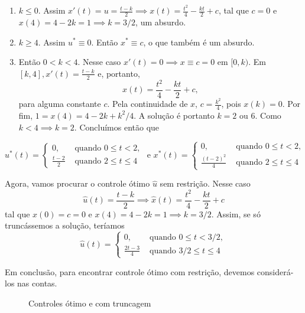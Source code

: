 \begin{enumerate}[label=\textbf{Caso \arabic*:}]
    \item $k \le 0$. Assim $x'(t) = u = \frac{t - k}{2} \implies x(t) = \frac{t^2}{4} - \frac{kt}{2} + c$, tal que $c=0$ e $x(4) = 4 - 2k = 1 \implies k = 3/2$, um absurdo. 
    
    \item $k \ge 4$. Assim $u^* \equiv 0$. Então $x^* \equiv c$, o que também é um absurdo. 
    
    \item Então $0 < k < 4$. Nesse caso $x'(t) = 0 \implies x \equiv c = 0$ em $[0,k)$. Em $[k,4], x'(t) = \frac{t-k}{2}$ e, portanto, 
    $$
    x(t) = \frac{t^2}{4} - \frac{kt}{2} + c,
    $$
    para alguma constante $c$. Pela continuidade de $x$, $c = \frac{k^2}{4}$, pois $x(k) = 0$. Por fim, $1 = x(4) = 4 - 2k + k^2/4$. A solução é portanto $k = 2 \text{ ou } 6$. Como $k < 4 \implies k = 2$. Concluímos então que 
\end{enumerate}
$$
u^*(t) = \begin{cases}
    0, &\text{ quando } 0 \le t < 2, \\ 
    \frac{t-2}{2} &\text{ quando } 2 \le t \le 4
\end{cases} \text{ e } x^*(t) = \begin{cases}
    0, &\text{ quando } 0 \le t < 2, \\ 
    \frac{(t-2)^2}{4} &\text{ quando } 2 \le t \le 4
\end{cases}
$$

Agora, vamos procurar o controle ótimo $\hat{u}$ sem restrição. Nesse caso 
$$
\hat{u}(t) = \frac{t-k}{2} \implies \hat{x}(t) = \frac{t^2}{4} - \frac{kt}{2}
+ c
$$
tal que $x(0) = c = 0$ e $x(4) = 4 - 2k = 1 \implies k = 3/2$. Assim, se só truncássemos a solução, teríamos 
$$
\hat{u}(t) = \begin{cases}
    0, &\text{ quando } 0 \le t < 3/2, \\ 
    \frac{2t-3}{4} &\text{ quando } 3/2 \le t \le 4
\end{cases}
$$

Em conclusão, para encontrar controle ótimo com restrição, devemos considerá-los nas contas. 

\begin{figure}[!hb]
    \center
    
    \caption{Controles ótimo e com truncagem}
\end{figure}